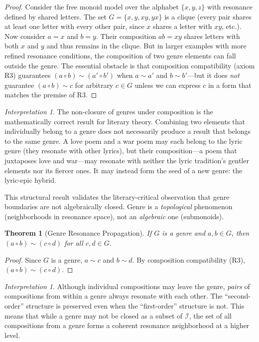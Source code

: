 \documentclass[11pt,openany]{book}
\theoremstyle{definition}
\theoremstyle{plain}
\newtheorem{theorem}[axiom]{Theorem}
\theoremstyle{remark}
\newtheorem{interpretation}[axiom]{Interpretation}
\newcommand{\IS}{\mathcal{I}}               %
\newcommand{\compose}{\circ}                 %
\newcommand{\res}{\sim}                      %
\begin{document}
\begin{proof}
Consider the free monoid model over the alphabet $\{x, y, z\}$ with resonance defined by shared letters. The set $G = \{x, y, xy, yx\}$ is a clique (every pair shares at least one letter with every other pair, since $x$ shares a letter with $xy$, etc.). Now consider $a = x$ and $b = y$. Their composition $ab = xy$ shares letters with both $x$ and $y$ and thus remains in the clique. But in larger examples with more refined resonance conditions, the composition of two genre elements can fall outside the genre. The essential obstacle is that composition compatibility (axiom R3) guarantees $(a \compose b) \res (a' \compose b')$ when $a \res a'$ and $b \res b'$---but it does \emph{not} guarantee $(a \compose b) \res c$ for arbitrary $c \in G$ unless we can express $c$ in a form that matches the premise of R3.
\end{proof}

\begin{interpretation}
The non-closure of genres under composition is the mathematically correct result for literary theory. Combining two elements that individually belong to a genre does not necessarily produce a result that belongs to the same genre. A love poem and a war poem may each belong to the lyric genre (they resonate with other lyrics), but their composition---a poem that juxtaposes love and war---may resonate with neither the lyric tradition's gentler elements nor its fiercer ones. It may instead form the seed of a new genre: the lyric-epic hybrid.

This structural result validates the literary-critical observation that genre boundaries are not algebraically closed. Genre is a \emph{topological} phenomenon (neighborhoods in resonance space), not an \emph{algebraic} one (submonoids).
\end{interpretation}

\begin{theorem}[Genre Resonance Propagation]
If $G$ is a genre and $a, b \in G$, then $(a \compose b) \res (c \compose d)$ for all $c, d \in G$.
\end{theorem}

\begin{proof}
Since $G$ is a genre, $a \res c$ and $b \res d$. By composition compatibility (R3), $(a \compose b) \res (c \compose d)$.
\end{proof}

\begin{interpretation}
Although individual compositions may leave the genre, \emph{pairs} of compositions from within a genre always resonate with each other. The ``second-order'' structure is preserved even when the ``first-order'' structure is not. This means that while a genre may not be closed as a subset of $\IS$, the set of all compositions from a genre forms a coherent resonance neighborhood at a higher level.
\end{interpretation}
\end{document}
